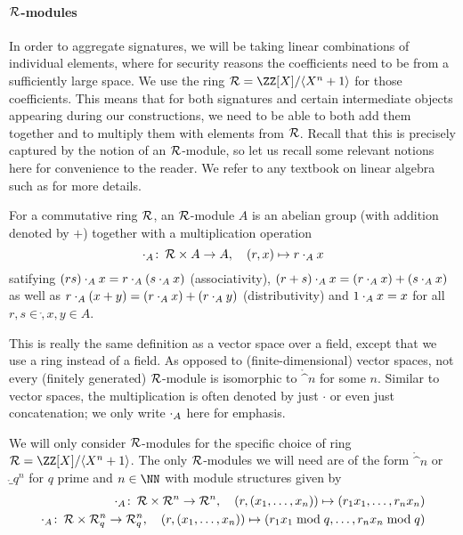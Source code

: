 \paragraph{$\mathcal{R}$-modules}
In order to aggregate signatures, we will be taking linear combinations of individual elements, where for security reasons the coefficients need to be from a sufficiently large space. We use the ring $\ring = \defring$ for those coefficients. This means that for both signatures and certain intermediate objects appearing during our constructions, we need to be able to both add them together and to multiply them with elements from $\mathcal{R}$. Recall that this is precisely captured by the notion of an $\mathcal{R}$-module, so let us recall some relevant notions here for convenience to the reader. We refer to any textbook on linear algebra such as \cite{FOO} for more details.
\begin{definition}
For a commutative ring $\mathcal{R}$, an $\mathcal{R}$-module $A$ is an abelian group (with addition denoted by $+$) together with a multiplication operation
\[
 \mathbin{\cdot_A}\colon\,\mathcal{R}\times A \to A,\quad (r, x)\mapsto r\mathbin{\cdot_A} x
\]
satifying $(rs)\mathbin{\cdot_A} x = r\mathbin{\cdot_A} (s\mathbin{\cdot_A} x)$ (associativity), $(r+s)\mathbin{\cdot_A} x = (r\mathbin{\cdot_A} x) + (s\mathbin{\cdot_A} x)$ as well as $r\mathbin{\cdot_A}(x + y) = (r\mathbin{\cdot_A} x) + (r\mathbin{\cdot_A} y)$ (distributivity) and $1\mathbin{\cdot_A} x = x$ for all $r,s\in\ring, x,y\in A$.
\end{definition}
This is really the same definition as a vector space over a field, except that we use a ring instead of a field. As opposed to (finite-dimensional) vector spaces, not every (finitely generated) $\mathcal{R}$-module is isomorphic to $\ring^n$ for some $n$. Similar to vector spaces, the multiplication is often denoted by just $\cdot$ or even just concatenation; we only write $\mathbin{\cdot_A}$ here for emphasis.

We will only consider $\mathcal{R}$-modules for the specific choice of ring $\ring = \defring$. The only $\mathcal{R}$-modules we will need are of the form $\ring^n$ or $\ring_q^n$ for $q$ prime and $n\in\NN$ with module structures given by
\begin{align*}
 \mathbin{\cdot_A}\colon\, \mathcal{R} \times \mathcal{R}^n \to \mathcal{R}^n, \quad (r,(x_1,\ldots, x_n))\mapsto (r_1x_1,\ldots,r_nx_n)\\
 \mathbin{\cdot_A}\colon\, \mathcal{R} \times \mathcal{R}_q^n \to \mathcal{R}_q^n,\quad (r,(x_1,\ldots, x_n)) \mapsto (r_1x_1\bmod q,\ldots, r_nx_n\bmod q)
\end{align*}


